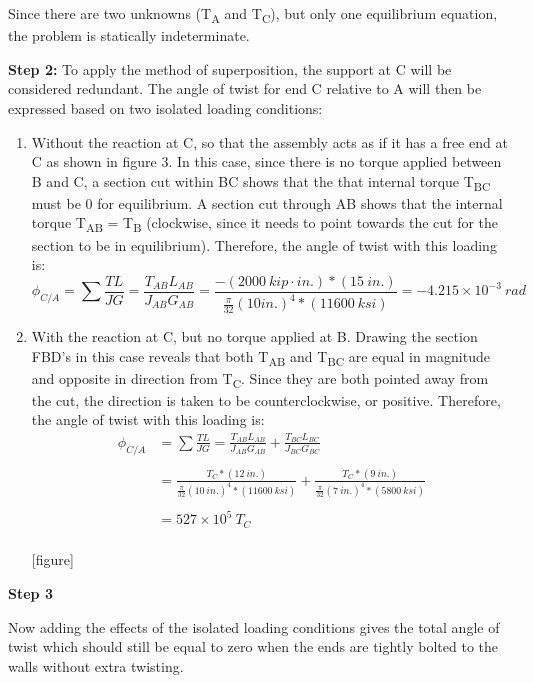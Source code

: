 \documentclass[
  letterpaper,
  DIV=11,
  numbers=noendperiod]{scrreprt}
\theoremstyle{definition}
\theoremstyle{remark}
\begin{document}
\begin{tcolorbox}
\begin{tcolorbox}
Since there are two unknowns (T\textsubscript{A} and
T\textsubscript{C}), but only one equilibrium equation, the problem is
statically indeterminate.

\textbf{Step 2:} To apply the method of superposition, the support at C
will be considered redundant. The angle of twist for end C relative to A
will then be expressed based on two isolated loading conditions:

\begin{enumerate}
\def\labelenumi{\arabic{enumi}.}
\item
  Without the reaction at C, so that the assembly acts as if it has a
  free end at C as shown in figure 3. In this case, since there is no
  torque applied between B and C, a section cut within BC shows that the
  that internal torque T\textsubscript{BC} must be 0 for equilibrium. A
  section cut through AB shows that the internal torque
  T\textsubscript{AB} = T\textsubscript{B} (clockwise, since it needs to
  point towards the cut for the section to be in equilibrium).
  Therefore, the angle of twist with this loading is:\\
  \[
  \phi_{C/A}=\sum \frac{TL}{JG}=\frac{T_{AB}L_{AB}}{J_{AB} {G}_{AB}}=\frac{-(2000{~kip}\cdot{in.})*(15{~in.})}{\frac{\pi}{32}(10{in.})^4*(11600{~ksi})}=-4.215 \times 10^{-3}{~rad}
  \]
\item
  With the reaction at C, but no torque applied at B. Drawing the
  section FBD's in this case reveals that both T\textsubscript{AB} and
  T\textsubscript{BC} are equal in magnitude and opposite in direction
  from T\textsubscript{C}. Since they are both pointed away from the
  cut, the direction is taken to be counterclockwise, or positive.
  Therefore, the angle of twist with this loading is:\\
  \[
  \begin{aligned}
  \phi_{C/A}&=\sum\frac{TL}{JG}=\frac{T_{AB}L_{AB}}{J_{AB}{G}_{AB}}+\frac{T_{BC}L_{BC}}{J_{BC}G_{BC}} \\
  \\
  &=\frac{T_C*(12{~in.})}{\frac{\pi}{32}(10{~in.})^4*(11600{~ksi})}+\frac{T_C*(9{~in.})}{\frac{\pi}{32}(7{~in.})^4*(5800{~ksi})} \\
  \\
  &=527\times 10^5~T_{C}
  \end{aligned}
  \]\\
  {[}figure{]}
\end{enumerate}

\textbf{Step 3}

Now adding the effects of the isolated loading conditions gives the
total angle of twist which should still be equal to zero when the ends
are tightly bolted to the walls without extra twisting.


\end{tcolorbox}
\end{tcolorbox}
\end{document}
